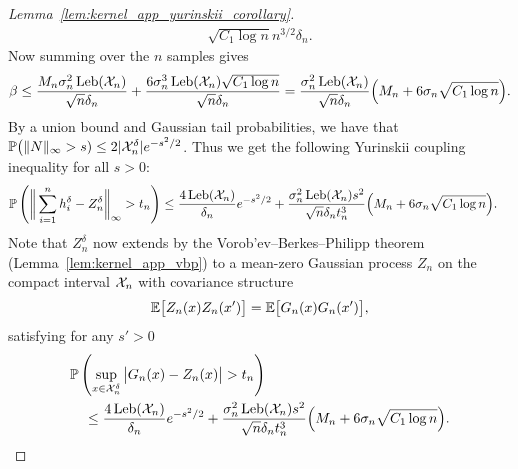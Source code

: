 \begin{proof}[Lemma~\ref{lem:kernel_app_yurinskii_corollary}]
\begin{align*}
{    \sqrt{C_1 \log n}}{n^{3/2} \delta_n}.
  \end{align*}
  Now summing over the $n$ samples gives
  \begin{align*}
    \beta
    \leq
    \frac{M_n \sigma_n^2 \operatorname{Leb}(\mathcal{X}_n)}{\sqrt n \delta_n}
    + \frac{6\sigma_n^3 \operatorname{Leb}(\mathcal{X}_n) \sqrt{C_1 \log n}}
    {\sqrt n \delta_n}
    =
    \frac{\sigma_n^2 \operatorname{Leb}(\mathcal{X}_n)}{\sqrt n \delta_n}
    \Big(M_n + 6\sigma_n \sqrt{C_1 \log n}\Big).
  \end{align*}
  By a union bound
  and Gaussian tail probabilities,
  we have that
  $\mathbb{P}\big( \|N\|_\infty > s)
  \leq 2|\mathcal{X}_n^\delta| e^{-s^2/2}$.
  Thus we get the following Yurinskii coupling inequality
  for all $s > 0$:
  \begin{align*}
    \mathbb{P}\left(
      \bigg\|
      \sum_{i=1}^n
      h_i^\delta
      - Z_n^\delta
      \bigg\|_\infty
      > t_n
    \right)
    &\leq
    \frac{4 \operatorname{Leb}(\mathcal{X}_n)}{\delta_n}
    e^{-s^2/2}
    + \frac{\sigma_n^2 \operatorname{Leb}(\mathcal{X}_n) s^2}{\sqrt n \delta_n t_n^3}
    \Big(M_n + 6 \sigma_n \sqrt{C_1 \log n}\Big).
  \end{align*}
  Note that
  $Z_n^\delta$
  now extends
  by the Vorob'ev--Berkes--Philipp theorem
  (Lemma~\ref{lem:kernel_app_vbp})
  to a mean-zero Gaussian
  process
  $Z_n$ on the compact interval $\mathcal{X}_n$
  with covariance structure
  \begin{align*}
    \mathbb{E}\big[
      Z_n(x)
      Z_n(x')
    \big]
    =
    \mathbb{E}\big[
      G_n(x)
      G_n(x')
    \big],
  \end{align*}
  satisfying for any $s' > 0$
  \begin{align*}
    &\mathbb{P}\left(
      \sup_{x \in \mathcal{X}_n^\delta}
      \big|
      G_n(x) - Z_n(x)
      \big|
      > t_n
    \right) \\
    &\quad\leq
    \frac{4 \operatorname{Leb}(\mathcal{X}_n)}{\delta_n}
    e^{-s^2/2}
    + \frac{\sigma_n^2 \operatorname{Leb}(\mathcal{X}_n) s^2}{\sqrt n \delta_n t_n^3}
    \Big(M_n + 6 \sigma_n \sqrt{C_1 \log n}\Big).
  \end{align*}



\end{proof}
